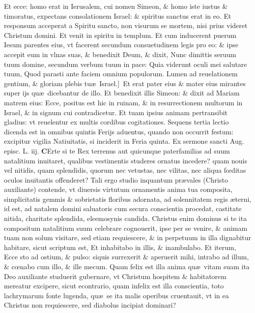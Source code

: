 \documentclass[a5paper,10pt]{book}
\def\rightmarginnote{%
	\lrmarginnote{\hskip\columnwidth \hskip -1em}}
\def\ae{æ}
\def\oe{œ}
\begin{document}
\begin{multicols*}{2}
Et ecce: homo erat in Ierusalem, cui nomen Simeon, \& homo iste iustus \& timoratus, expectans consolationem Israel: \& spiritus sanctus erat in eo.
Et responsum acceperat a Spiritu sancto, non visurum se mortem, nisi prius videret Christum domini. Et venit in spiritu in templum.
Et cum inducerent puerum Iesum parentes eius, vt facerent secundum consuetudinem legis pro eo: \& ipse accepit eum in vlnas suas, \& benedixit Deum, \& dixit, Nunc dimittis seruum tuum domine, secundum verbum tuum in pace: Quia viderunt oculi mei salutare tuum, Quod parasti ante faciem omnium populorum.
Lumen ad reuelationem gentium, \& gloriam plebis tu\ae \ Israel.]\textdagger \ 
Et\rightmarginnote{E} erat pater eius \& mater eius mirantes super ijs qu\ae \ dicebantur de illo.
Et benedixit illis Simeon: \& dixit ad Mariam matrem eius: Ecce, positus est hic in ruinam, \& in resurrectionem multorum in Israel, \& in signum cui contradicetur.
Et tuam ipsius animam pertransibit gladius: vt reuelentur ex multis cordibus cogitationes.
\newline {} \color{red} Sequens tertia lectio dicenda est in omnibus quintis Ferijs aduentus, quando non occurrit festum: excipitur vigilia Natiuitatis, si inciderit in Feria quinta. \color{black}
\newline \color{red} Ex sermone sancti Aug. episc. L. iij. \color{black}
\vspace{-.25em}
\lettrine[lines=2]{\bfseries \color{red} C}{}Erte si te Rex terrenus aut quicunque paterfamilias ad suum natalitium inuitaret, qualibus vestimentis studeres ornatus incedere? quam nouis vel nitidis, quam splendidis, quorum nec vetustas, nec vilitas, nec aliqua f\oe ditas oculos inuitantis offenderet?
Tali ergo studio inquantum pr\ae vales (Christo auxiliante) contende, vt diuersis virtutum ornamentis anima tua composita, simplicitatis gemmis \& sobrietatis floribus adornata, ad solennitatem regis \ae terni, id est, ad natalem domini saluatoris cum secura conscientia procedat, castitate nitida, charitate splendida, eleemosynis candida.
Christus enim dominus si te ita compositum natalitium suum celebrare cognouerit, ipse per se venire, \& animam tuam non solum visitare, sed etiam requiescere, \& in perpetuum in illa dignabitur habitare, sicut scriptum est, Et inhabitabo in illis, \& inambulabo.
Et iterum, Ecce sto ad ostium, \& pulso: siquis surrexerit \& aperuerit mihi, intrabo ad illum, \& c\oe nabo cum illo, \& ille mecum.
Quam felix est illa anima qu\ae \ vitam suam ita Deo auxiliante studuerit gubernare, vt Christum hospitem \& habitatorem mereatur excipere, sicut econtrario, quam infelix est illa conscientia, toto lachrymarum fonte lugenda, qu\ae \ se ita malis operibus cruentauit, vt in ea Christus non requiescere, sed diabolus incipiat dominari?

\end{multicols*}
\end{document}

